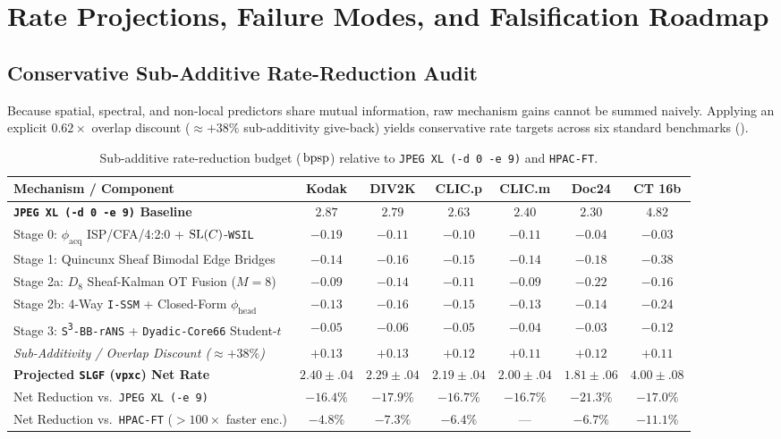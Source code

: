 \section{Rate Projections, Failure Modes, and Falsification Roadmap}
\label{sec:roadmap}

\subsection{Conservative Sub-Additive Rate-Reduction Audit}
Because spatial, spectral, and non-local predictors share mutual information, raw mechanism gains cannot be summed naively. Applying an explicit $0.62\times$ overlap discount ($\approx +38\%$ sub-additivity give-back) yields conservative rate targets across six standard benchmarks ().

\begin{table}[htbp]
\centering
\caption{Sub-additive rate-reduction budget ($\,\mathrm{bpsp}$) relative to \texttt{JPEG~XL (-d~0 -e~9)} and \texttt{HPAC-FT}.}
\label{tab:rate-budget}
\footnotesize
\setlength{\tabcolsep}{4.5pt}
\begin{tabular}{@{}lcccccc@{}}
\toprule
\textbf{Mechanism / Component} & \textbf{Kodak} & \textbf{DIV2K} & \textbf{CLIC.p} & \textbf{CLIC.m} & \textbf{Doc24} & \textbf{CT 16b} \\
\midrule
\textbf{\texttt{JPEG XL (-d 0 -e 9)} Baseline} & $\mathbf{2.87}$ & $\mathbf{2.79}$ & $\mathbf{2.63}$ & $\mathbf{2.40}$ & $\mathbf{2.30}$ & $\mathbf{4.82}$ \\
Stage 0: $\phi_{\mathrm{acq}}$ ISP/CFA/4:2:0 + $\mathrm{SL}(C)$-\texttt{WSIL} & $-0.19$ & $-0.11$ & $-0.10$ & $-0.11$ & $-0.04$ & $-0.03$ \\
Stage 1: Quincunx Sheaf Bimodal Edge Bridges & $-0.14$ & $-0.16$ & $-0.15$ & $-0.14$ & $-0.18$ & $-0.38$ \\
Stage 2a: $D_8$ Sheaf-Kalman OT Fusion ($M=8$) & $-0.09$ & $-0.14$ & $-0.11$ & $-0.09$ & $-0.22$ & $-0.16$ \\
Stage 2b: 4-Way \texttt{I-SSM} + Closed-Form $\phi_{\mathrm{head}}$ & $-0.13$ & $-0.16$ & $-0.15$ & $-0.13$ & $-0.14$ & $-0.24$ \\
Stage 3: \texttt{S\textsuperscript{3}-BB-rANS} + \texttt{Dyadic-Core66} Student-$t$ & $-0.05$ & $-0.06$ & $-0.05$ & $-0.04$ & $-0.03$ & $-0.12$ \\
\emph{Sub-Additivity / Overlap Discount ($\approx +38\%$)} & $+0.13$ & $+0.13$ & $+0.12$ & $+0.11$ & $+0.12$ & $+0.11$ \\
\midrule
\textbf{Projected \texttt{SLGF} (\texttt{vpxc}) Net Rate} & $\mathbf{2.40 \pm .04}$ & $\mathbf{2.29 \pm .04}$ & $\mathbf{2.19 \pm .04}$ & $\mathbf{2.00 \pm .04}$ & $\mathbf{1.81 \pm .06}$ & $\mathbf{4.00 \pm .08}$ \\
Net Reduction vs.\ \texttt{JPEG XL (-e 9)} & $-16.4\%$ & $-17.9\%$ & $-16.7\%$ & $-16.7\%$ & $-21.3\%$ & $-17.0\%$ \\
Net Reduction vs.\ \texttt{HPAC-FT} ($>100\times$ faster enc.) & $-4.8\%$ & $-7.3\%$ & $-6.4\%$ & --- & $-6.7\%$ & $-11.1\%$ \\
\bottomrule
\end{tabular}
\end{table}

